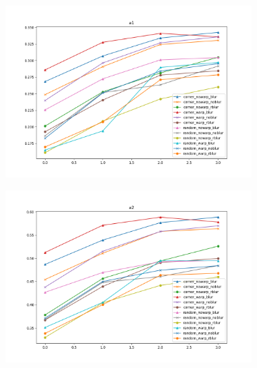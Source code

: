 \begin{figure}
\begin{adjustwidth}{-0.2\textwidth}{-0.2\textwidth}
\begin{subfigure}{0.6\textwidth}
            \includegraphics[width=\textwidth]{figs/a1}
        \end{subfigure}
        \hspace{0cm}
        \begin{subfigure}{0.6\textwidth}
            \includegraphics[width=\textwidth]{figs/a2}
        \end{subfigure}
        \hspace{0cm}


\end{adjustwidth}
\end{figure}
